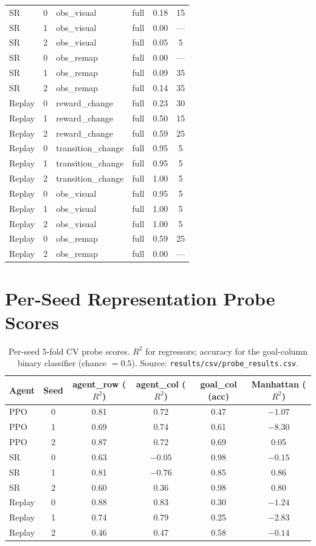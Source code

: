 \begin{table}[h]
\begin{tabular}{@{}l l l l c c@{}}
SR & 0 & obs\_visual & full & 0.18 & 15 \\
SR & 1 & obs\_visual & full & 0.00 & --- \\
SR & 2 & obs\_visual & full & 0.05 & 5 \\
SR & 0 & obs\_remap & full & 0.00 & --- \\
SR & 1 & obs\_remap & full & 0.09 & 35 \\
SR & 2 & obs\_remap & full & 0.14 & 35 \\
\midrule
Replay & 0 & reward\_change & full & 0.23 & 30 \\
Replay & 1 & reward\_change & full & 0.50 & 15 \\
Replay & 2 & reward\_change & full & 0.59 & 25 \\
Replay & 0 & transition\_change & full & 0.95 & 5 \\
Replay & 1 & transition\_change & full & 0.95 & 5 \\
Replay & 2 & transition\_change & full & 1.00 & 5 \\
Replay & 0 & obs\_visual & full & 0.95 & 5 \\
Replay & 1 & obs\_visual & full & 1.00 & 5 \\
Replay & 2 & obs\_visual & full & 1.00 & 5 \\
Replay & 0 & obs\_remap & full & 0.59 & 25 \\
Replay & 2 & obs\_remap & full & 0.00 & --- \\
\bottomrule
\end{tabular}
\end{table}

\section{Per-Seed Representation Probe Scores}
\label{app:probe}

\begin{table}[h]
\centering
\small
\caption{Per-seed 5-fold CV probe scores. $R^2$ for regressors; accuracy for the goal-column binary classifier (chance $=0.5$). Source: \texttt{results/csv/probe\_results.csv}.}
\label{tab:probe-per-seed}
\begin{tabular}{@{}l c c c c c@{}}
\toprule
Agent & Seed & agent\_row ($R^2$) & agent\_col ($R^2$) & goal\_col (acc) & Manhattan ($R^2$) \\
\midrule
PPO & 0 & 0.81 & 0.72 & 0.47 & $-1.07$ \\
PPO & 1 & 0.69 & 0.74 & 0.61 & $-8.30$ \\
PPO & 2 & 0.87 & 0.72 & 0.69 & 0.05 \\
\midrule
SR & 0 & 0.63 & $-0.05$ & 0.98 & $-0.15$ \\
SR & 1 & 0.81 & $-0.76$ & 0.85 & 0.86 \\
SR & 2 & 0.60 & 0.36 & 0.98 & 0.80 \\
\midrule
Replay & 0 & 0.88 & 0.83 & 0.30 & $-1.24$ \\
Replay & 1 & 0.74 & 0.79 & 0.25 & $-2.83$ \\
Replay & 2 & 0.46 & 0.47 & 0.58 & $-0.14$ \\
\bottomrule
\end{tabular}
\end{table}

